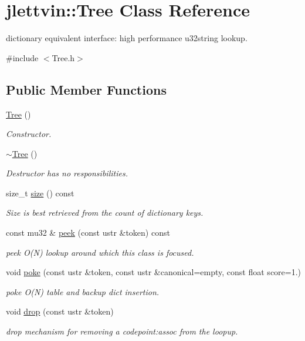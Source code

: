 \hypertarget{classjlettvin_1_1_tree}{}\section{jlettvin\+:\+:Tree Class Reference}
\label{classjlettvin_1_1_tree}


dictionary equivalent interface\+: high performance u32string lookup.  




{\ttfamily \#include $<$Tree.\+h$>$}

\subsection*{Public Member Functions}
\begin{DoxyCompactItemize}
\item 
\hyperlink{classjlettvin_1_1_tree_ad376a7c639d857312f5de2ef47482f68}{Tree} ()
\begin{DoxyCompactList}\small\item\em Constructor. \end{DoxyCompactList}\item 
\hyperlink{classjlettvin_1_1_tree_abdc38545cf3f588725b5d8b8075b3866}{$\sim$\+Tree} ()
\begin{DoxyCompactList}\small\item\em Destructor has no responsibilities. \end{DoxyCompactList}\item 
size\+\_\+t \hyperlink{classjlettvin_1_1_tree_a1edf6251d8a3aa6a3a40d261339b83c6}{size} () const 
\begin{DoxyCompactList}\small\item\em Size is best retrieved from the count of dictionary keys. \end{DoxyCompactList}\item 
const mu32 \& \hyperlink{classjlettvin_1_1_tree_a16e739590aa05b017eb2b058a00b62ae}{peek} (const ustr \&token) const 
\begin{DoxyCompactList}\small\item\em peek O(\+N) lookup around which this class is focused. \end{DoxyCompactList}\item 
void \hyperlink{classjlettvin_1_1_tree_a3ffabbc1a6b81df085827f3ed851f061}{poke} (const ustr \&token, const ustr \&canonical=empty, const float score=1.)
\begin{DoxyCompactList}\small\item\em poke O(\+N) table and backup dict insertion. \end{DoxyCompactList}\item 
void \hyperlink{classjlettvin_1_1_tree_af6eacfd1dc52c39d9363857ea9aa6ac9}{drop} (const ustr \&token)
\begin{DoxyCompactList}\small\item\em drop mechanism for removing a codepoint\+:assoc from the loopup. \end{DoxyCompactList}\end{DoxyCompactItemize}



